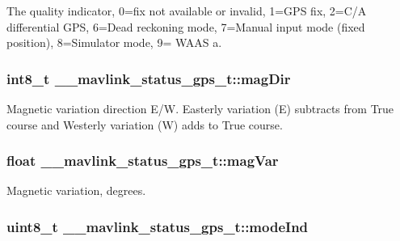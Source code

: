 The quality indicator, 0=fix not available or invalid, 1=G\+P\+S fix, 2=C/\+A differential G\+P\+S, 6=Dead reckoning mode, 7=Manual input mode (fixed position), 8=Simulator mode, 9= W\+A\+A\+S a. 

\hypertarget{struct____mavlink__status__gps__t_afa2fba66d9c86959e3468554871c3393}{
\subsubsection[{mag\+Dir}]{\setlength{\rightskip}{0pt plus 5cm}int8\+\_\+t \+\_\+\+\_\+mavlink\+\_\+status\+\_\+gps\+\_\+t\+::mag\+Dir}}\label{struct____mavlink__status__gps__t_afa2fba66d9c86959e3468554871c3393}


Magnetic variation direction E/\+W. Easterly variation (E) subtracts from True course and Westerly variation (W) adds to True course. 

\hypertarget{struct____mavlink__status__gps__t_a41cbb27a8dac54c0b56e8408207cbbad}{
\subsubsection[{mag\+Var}]{\setlength{\rightskip}{0pt plus 5cm}float \+\_\+\+\_\+mavlink\+\_\+status\+\_\+gps\+\_\+t\+::mag\+Var}}\label{struct____mavlink__status__gps__t_a41cbb27a8dac54c0b56e8408207cbbad}


Magnetic variation, degrees. 

\hypertarget{struct____mavlink__status__gps__t_a4e700ec21561fc1deaa021942b6cde87}{
\subsubsection[{mode\+Ind}]{\setlength{\rightskip}{0pt plus 5cm}uint8\+\_\+t \+\_\+\+\_\+mavlink\+\_\+status\+\_\+gps\+\_\+t\+::mode\+Ind}}\label{struct____mavlink__status__gps__t_a4e700ec21561fc1deaa021942b6cde87}


